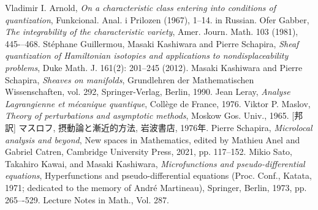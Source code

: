 \documentclass[11pt, a4paper, dvipdfmx]{jlreq}
\theoremstyle{definition}
\theoremstyle{mystyle}
\numberwithin{equation}{section} %
\begin{document}
\begin{thebibliography}{15}
     Vladimir I. Arnold, 
    \textit{On a characteristic class entering into conditions of quantization}, 
    Funkcional. Anal. i Prilozen (1967), 1–14. in Russian.
    Ofer Gabber, \textit{The integrability of the characteristic variety}, 
    Amer. Journ. Math. 103 (1981), 445-–468.
    Stéphane Guillermou, Masaki Kashiwara and Pierre Schapira, 
    \textit{Sheaf quantization of Hamiltonian isotopies and applications to nondisplaceability problems}, 
    Duke Math. J. 161(2): 201--245 (2012).
     Masaki Kashiwara and Pierre Schapira, 
    \textit{Sheaves on manifolds}, Grundlehren der Mathematischen Wissenschaften, 
    vol. 292, Springer-Verlag, Berlin, 1990.
    Jean Leray, \textit{Analyse Lagrangienne et m\'ecanique quantique}, 
    Coll\`ege de France, 1976.
     Viktor P. Maslov, 
    \textit{Theory of perturbations and asymptotic methods}, 
    Moskow Gos. Univ., 1965.
    [邦訳] マスロフ, 摂動論と漸近的方法, 岩波書店, 1976年.
    Pierre Schapira, 
    \textit{Microlocal analysis and beyond}, 
    New spaces in Mathematics, edited by Mathieu Anel 
    and Gabriel Catren, 
    Cambridge University Press, 2021, pp. 117--152.
    Mikio Sato, Takahiro Kawai, and Masaki Kashiwara, 
    \textit{Microfunctions and pseudo-differential equations}, 
    Hyperfunctions and pseudo-differential equations 
    (Proc. Conf., Katata, 1971; dedicated to the memory of 
    Andr\'e Martineau), 
    Springer, Berlin, 1973, pp. 265–-529. 
    Lecture Notes in Math., Vol. 287.

\end{thebibliography}
%
%
\end{document}

